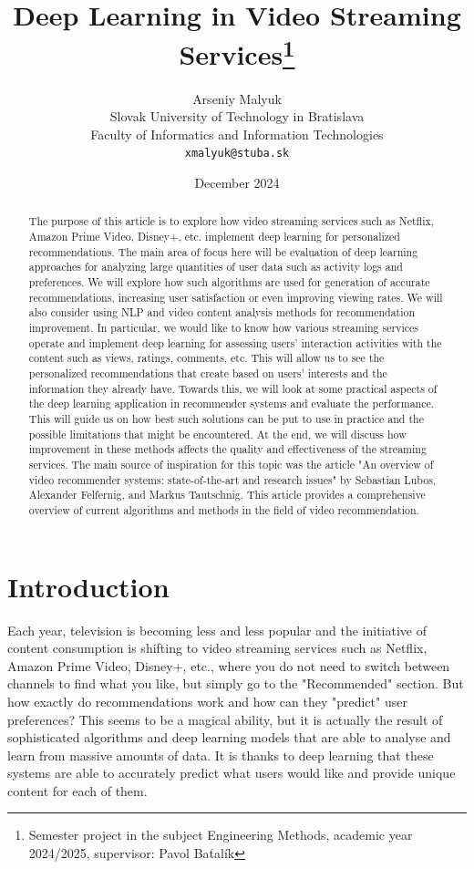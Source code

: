 \documentclass[12pt, english, a4paper]{article}
\title{Deep Learning in Video Streaming Services\thanks{Semester project in the subject Engineering Methods, academic year 2024/2025, supervisor: Pavol Baťalík}}
\author{Arseniy Malyuk\\[2pt]
	{\small Slovak University of Technology in Bratislava}\\
	{\small Faculty of Informatics and Information Technologies}\\
	{\small \texttt{xmalyuk@stuba.sk}}
	}
\date{\small December 2024}
\begin{document}
\maketitle

\begin{abstract}

    The purpose of this article is to explore how video streaming services such as Netflix, Amazon Prime Video, Disney+, etc. implement deep learning for personalized recommendations. The main area of focus here will be evaluation of deep learning approaches for analyzing large quantities of user data such as activity logs and preferences. We will explore how such algorithms are used for generation of accurate recommendations, increasing user satisfaction or even improving viewing rates. We will also consider using NLP and video content analysis methods for recommendation improvement. In particular, we would like to know how various streaming services operate and implement deep learning for assessing users’ interaction activities with the content such as views, ratings, comments, etc. This will allow us to see the personalized recommendations that create based on users’ interests and the information they already have. Towards this, we will look at some practical aspects of the deep learning application in recommender systems and evaluate the performance. This will guide us on how best such solutions can be put to use in practice and the possible limitations that might be encountered. At the end, we will discuss how improvement in these methods affects the quality and effectiveness of the streaming services. The main source of inspiration for this topic was the article "An overview of video recommender systems: state-of-the-art and research issues" \cite{Lubos2023} by Sebastian Lubos, Alexander Felfernig, and Markus Tautschnig. This article provides a comprehensive overview of current algorithms and methods in the field of video recommendation.
    
\end{abstract}

\newpage

\section{Introduction}

\hspace*{2em}Each year, television is becoming less and less popular and the initiative of content consumption is shifting to video streaming services such as Netflix, Amazon Prime Video, Disney+, etc., where you do not need to switch between channels to find what you like, but simply go to the "Recommended" section. But how exactly do recommendations work and how can they "predict" user preferences? This seems to be a magical ability, but it is actually the result of sophisticated algorithms and deep learning models that are able to analyse and learn from massive amounts of data. It is thanks to deep learning that these systems are able to accurately predict what users would like and provide unique content for each of them.
\end{document}
